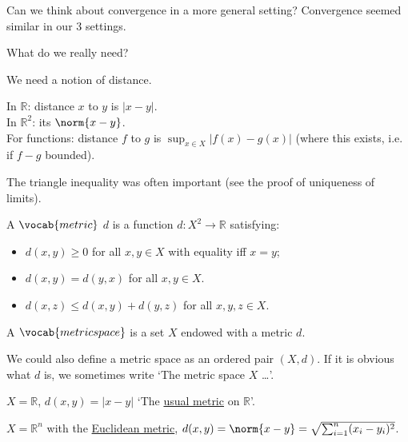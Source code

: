     \begin{question}
        Can we think about convergence in a more general setting? Convergence seemed similar in our 3 settings.

        What do we really need?
    \end{question} 
    \begin{answer}
        We need a notion of distance.

        In $\mathbb{R}$: distance $x$ to $y$ is $|x-y|$. \\
        In $\mathbb{R}^2$: its $\norm{x - y}$. \\
        For functions: distance $f$ to $g$ is $\sup_{x \in X} |f(x) - g(x)|$ (where this exists, i.e. if $f - g$ bounded).

        The triangle inequality was often important (see the proof of uniqueness of limits).
    \end{answer}
    
    \begin{definition}[Metric]
        A $\vocab{metric}$ $d$ is a function $d : X^2 \to \mathbb{R}$ satisfying:
        \begin{itemize}
            \item $d(x, y) \geq 0$ for all $x, y \in X$ with equality iff $x = y$;
            \item $d(x, y) = d(y, x)$ for all $x, y \in X$.
            \item $d(x, z) \leq d(x, y) + d(y, z)$ for all $x, y, z \in X$.
        \end{itemize} 
    \end{definition} 

    \begin{definition}
        A $\vocab{metric space}$ is a set $X$ endowed with a metric $d$.
    \end{definition} 
    We could also define a metric space as an ordered pair $(X, d)$.
    If it is obvious what $d$ is, we sometimes write `The metric space $X$ \dots'.

    \begin{example}
        $X = \mathbb{R}$, $d(x, y) = |x - y|$
        `The \underline{usual metric} on $\mathbb{R}$'.
    \end{example} 

    \begin{example}
        $X = \mathbb{R}^n$ with the \underline{Euclidean metric}, $d(x, y) = \norm{x - y} = \sqrt{\sum_{i=1}^{n} (x_i - y_i)^2}$.
    \end{example} 

